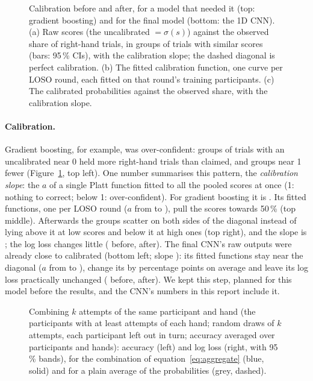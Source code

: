 \begin{figure}[tbp]
\centering
{}
\caption{Calibration before and after, for a model that needed it (top: gradient boosting) and for the final model
(bottom: the 1D CNN). (a) Raw scores (the uncalibrated \pright{} $= \sigma(s)$) against the observed share of
right-hand trials, in  groups of trials with similar scores (bars: 95\,\% CIs), with the
calibration slope; the dashed diagonal is perfect calibration. (b) The fitted calibration function, one curve per LOSO
round, each fitted on that round's training participants. (c) The calibrated probabilities against the observed
share, with the calibration slope.}
\label{fig:calibration}
\end{figure}

\paragraph{Calibration.} Gradient boosting, for example, was over-confident: groups of trials with an uncalibrated
\pright{} near 0 held more right-hand trials than claimed, and groups near 1 fewer (Figure~\ref{fig:calibration}, top left). One number
summarises this pattern, the \emph{calibration slope}: the $a$ of a single Platt function fitted to all the pooled
scores at once (1: nothing to correct; below 1: over-confident). For gradient boosting it is
. Its  fitted functions, one per LOSO round ($a$ from
 to ), pull the scores towards 50\,\% (top middle). Afterwards the
groups scatter on both sides of the diagonal instead of lying above it at low scores and below it at high ones
(top right), and the slope is ; the log loss changes little
( before,  after). The final CNN's raw outputs were already close to calibrated (bottom left; slope
): its fitted functions stay near the diagonal ($a$ from  to
), change its \pright{} by  percentage points on average and leave
its log loss practically unchanged ( before,  after). We kept
this step, planned for this model before the results, and the CNN's numbers in this report include it.

\begin{figure}[tbp]
\centering
{}
\caption{Combining $k$ attempts of the same participant and hand (the  participants with at
least  attempts of each hand; random draws of $k$ attempts, each participant left out in turn;
accuracy averaged over participants and hands): accuracy (left) and log loss (right, with 95\,\% bands), for the
combination of equation~\eqref{eq:aggregate} (blue, solid) and for a plain average of the probabilities (grey,
dashed).}
\label{fig:attempts}
\end{figure}

